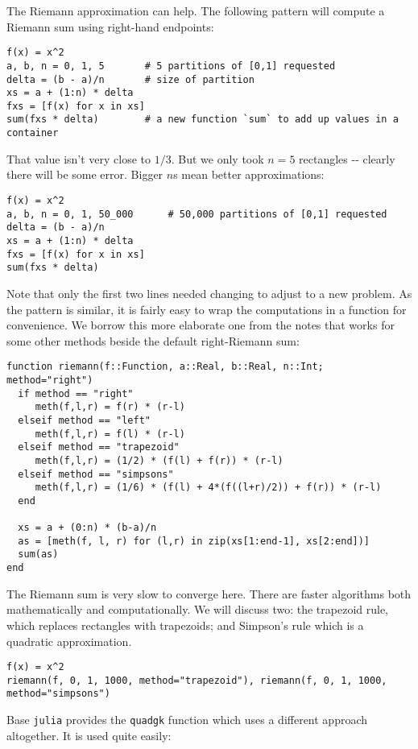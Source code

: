 \documentclass[12pt]{article}
\begin{document}
The Riemann approximation can help. The following pattern will compute a
Riemann sum using right-hand endpoints:



\begin{verbatim}
f(x) = x^2
a, b, n = 0, 1, 5       # 5 partitions of [0,1] requested
delta = (b - a)/n       # size of partition
xs = a + (1:n) * delta  
fxs = [f(x) for x in xs]
sum(fxs * delta)        # a new function `sum` to add up values in a container
\end{verbatim}
That value isn't very close to $1/3$. But we only took $n=5$ rectangles
-{}- clearly there will be some error. Bigger $n$s mean better
approximations:



\begin{verbatim}
f(x) = x^2
a, b, n = 0, 1, 50_000      # 50,000 partitions of [0,1] requested
delta = (b - a)/n       
xs = a + (1:n) * delta  
fxs = [f(x) for x in xs]
sum(fxs * delta)
\end{verbatim}
Note that only the first two lines needed changing to adjust to a new
problem. As the pattern is similar, it is fairly easy to wrap the
computations in a function for convenience. We borrow this more
elaborate one from the notes that works for some other methods beside
the default right-Riemann sum:



\begin{verbatim}
function riemann(f::Function, a::Real, b::Real, n::Int; method="right")
  if method == "right"
     meth(f,l,r) = f(r) * (r-l)
  elseif method == "left"
     meth(f,l,r) = f(l) * (r-l)
  elseif method == "trapezoid"
     meth(f,l,r) = (1/2) * (f(l) + f(r)) * (r-l)
  elseif method == "simpsons"
     meth(f,l,r) = (1/6) * (f(l) + 4*(f((l+r)/2)) + f(r)) * (r-l)
  end

  xs = a + (0:n) * (b-a)/n
  as = [meth(f, l, r) for (l,r) in zip(xs[1:end-1], xs[2:end])]
  sum(as)
end
\end{verbatim}
The Riemann sum is very slow to converge here. There are faster
algorithms both mathematically and computationally. We will discuss two:
the trapezoid rule, which replaces rectangles with trapezoids; and
Simpson's rule which is a quadratic approximation.



\begin{verbatim}
f(x) = x^2
riemann(f, 0, 1, 1000, method="trapezoid"), riemann(f, 0, 1, 1000, method="simpsons")
\end{verbatim}
Base \texttt{julia} provides the \texttt{quadgk} function which uses a
different approach altogether. It is used quite easily:
\end{document}
